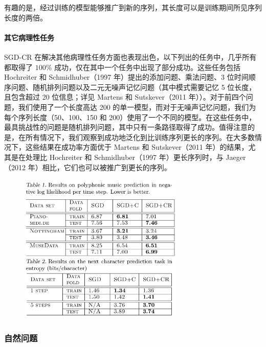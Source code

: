 有趣的是，经过训练的模型能够推广到新的序列，其长度可以是训练期间所见序列长度的两倍。

\paragraph{其它病理性任务}\label{412-ux5176ux5b83ux75c5ux7406ux6027ux4efbux52a1}

SGD-CR 在解决其他病理性任务方面也表现出色，以下列出的任务中，几乎所有都取得了 \(100\%\) 成功，仅在其中一个任务中出现了部分成功。这些任务包括 Hochreiter 和 Schmidhuber（1997 年）提出的添加问题、乘法问题、3 位时间顺序问题、随机排列问题以及二元无噪声记忆问题（其中模式需要记忆 5 位长度，且包含超过 20 位信息；详见 Martens 和 Sutskever（2011 年））。对于前四个问题，我们使用了一个长度高达 200 的单一模型，而对于无噪声记忆问题，我们为每个序列长度（50、100、150 和 200）使用了一个不同的模型。在这些任务中，最具挑战性的问题是随机排列问题，其中只有一条路径取得了成功。值得注意的是，在所有情况下，我们观察到成功地泛化到比训练序列更长的序列。在大多数情况下，这些结果在成功率方面优于 Martens 和 Sutskever（2011 年）的结果，尤其是在处理比 Hochreiter 和 Schmidhuber（1997 年）更长序列时，与 Jaeger（2012 年）相比，它们也可以被推广到更长的序列。

\begin{figure}[htbp]
  \centering
  \includegraphics[width=0.7\textwidth]{figures/IMG_C79A75F13077-1.jpeg}
  \label{fig:other}
\end{figure}

\subsubsection{自然问题}\label{42-ux81eaux7136ux95eeux9898}

